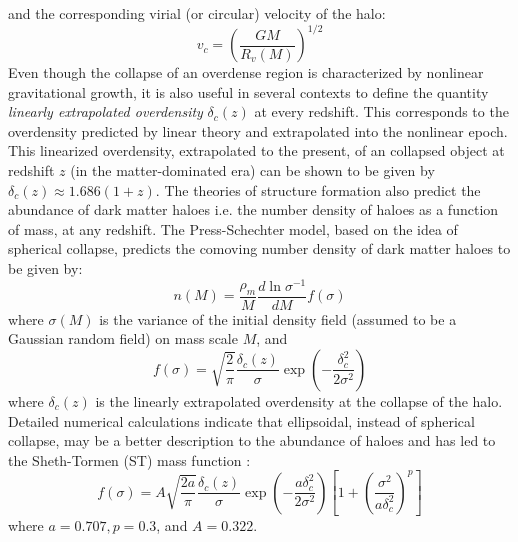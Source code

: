  and the corresponding virial (or circular) velocity of the halo:
 \begin{equation}
  v_c = \left(\frac{G M}{R_v(M)}\right)^{1/2}
  \label{virvel}
 \end{equation} 
 Even though the collapse of an overdense region is characterized by nonlinear gravitational growth, it is also useful in several contexts to define the quantity \textit{linearly extrapolated overdensity} $\delta_c(z)$ at every redshift. This corresponds to the overdensity predicted by linear theory and extrapolated into the nonlinear epoch. This linearized overdensity, extrapolated to the present, of an collapsed object at redshift $z$ (in the matter-dominated era) can be shown to be given by $\delta_c(z) \approx 1.686(1 + z)$.
 The theories of structure formation also predict the abundance of dark matter haloes i.e. the number density of haloes as a function of mass, at any redshift. The Press-Schechter model, based on the idea of spherical collapse, predicts the comoving number density of dark matter haloes to be given by:
 \begin{equation}
  n(M) = \frac{\rho_m}{M} \frac{d \ln \sigma^{-1}}{d M} f(\sigma)
 \end{equation} 
 where $\sigma(M)$ is the variance of the initial density field (assumed to be a Gaussian random field) on mass scale $M$, and 
 \begin{equation}
f(\sigma) = \sqrt{\frac{2}{\pi}} \frac{\delta_c(z)}{\sigma} \exp\left(-\frac{\delta_c^2}{2 \sigma^2} \right)
\end{equation}  
 where $\delta_c(z)$ is the linearly extrapolated overdensity at the collapse of the halo. 
 Detailed numerical calculations indicate that ellipsoidal, instead of spherical collapse, may be a better description to the abundance of haloes and has led to the Sheth-Tormen (ST) mass function \cite{sheth2002}:
 \begin{equation}
 f(\sigma) = A \sqrt{\frac{2 a}{\pi}} \frac{\delta_c(z)}{\sigma} \exp\left(-\frac{a \delta_c^2}{2 \sigma^2} \right) \left[1 + \left(\frac{\sigma^2}{a \delta_c^2}\right)^p \right]
 \end{equation} 
 where $a = 0.707, p = 0.3$, and $A = 0.322$. 
 
